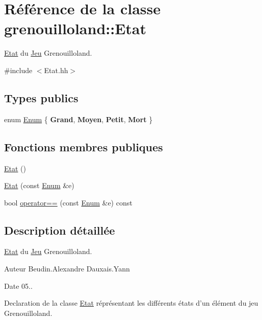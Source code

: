 \hypertarget{classgrenouilloland_1_1Etat}{\section{Référence de la classe grenouilloland\-:\-:Etat}
\label{classgrenouilloland_1_1Etat}
}


\hyperlink{classgrenouilloland_1_1Etat}{Etat} du \hyperlink{classgrenouilloland_1_1Jeu}{Jeu} Grenouilloland.  




{\ttfamily \#include $<$Etat.\-hh$>$}

\subsection*{Types publics}
\begin{DoxyCompactItemize}
\item 
enum \hyperlink{classgrenouilloland_1_1Etat_a04e979910c6a5857330cebd68038c528}{Enum} \{ {\bfseries Grand}, 
{\bfseries Moyen}, 
{\bfseries Petit}, 
{\bfseries Mort}
 \}
\end{DoxyCompactItemize}
\subsection*{Fonctions membres publiques}
\begin{DoxyCompactItemize}
\item 
\hyperlink{classgrenouilloland_1_1Etat_af35c6b8c0aaae1a0d8d5e19b03320a32}{Etat} ()
\item 
\hyperlink{classgrenouilloland_1_1Etat_adfac536ad3aceee730c8944e1d9a8ef1}{Etat} (const \hyperlink{classgrenouilloland_1_1Etat_a04e979910c6a5857330cebd68038c528}{Enum} \&e)
\item 
bool \hyperlink{classgrenouilloland_1_1Etat_a8df3493bfad0afcb6ae8f4dd0e81bf16}{operator==} (const \hyperlink{classgrenouilloland_1_1Etat_a04e979910c6a5857330cebd68038c528}{Enum} \&e) const 
\end{DoxyCompactItemize}


\subsection{Description détaillée}
\hyperlink{classgrenouilloland_1_1Etat}{Etat} du \hyperlink{classgrenouilloland_1_1Jeu}{Jeu} Grenouilloland. 

\begin{DoxyAuthor}{Auteur}
Beudin.\-Alexandre Dauxais.\-Yann 
\end{DoxyAuthor}
\begin{DoxyDate}{Date}
05..
\end{DoxyDate}
Declaration de la classe \hyperlink{classgrenouilloland_1_1Etat}{Etat} réprésentant les différents états d'un élément du jeu Grenouilloland. 

